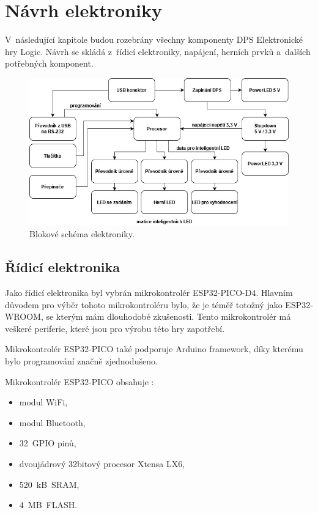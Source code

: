 \chapter{Návrh elektroniky}
V~následující kapitole budou rozebrány všechny komponenty DPS Elektronické hry Logic. Návrh se skládá z~řídicí elektroniky, 
napájení, herních prvků a~dalších potřebných komponent.

\begin{figure}[!h]
  \begin{center}
    \includegraphics[scale=0.6]{obrazky/v2_blokove_schema.jpg}
  \end{center}
  \caption[Blokové schéma elektroniky]{Blokové schéma elektroniky.}
\end{figure}    

\section{Řídicí elektronika} \label{Ridici_elektronika}
Jako řídicí elektronika byl vybrán mikrokontrolér ESP32-PICO-D4. Hlavním důvodem pro výběr tohoto mikrokontroléru bylo, že je téměř totožný 
jako ESP32-WROOM, se 
kterým mám dlouhodobé zkušenosti. Tento mikrokontrolér má veškeré periferie, které jsou pro výrobu této hry zapotřebí. 

Mikrokontrolér ESP32-PICO také podporuje Arduino framework, díky kterému bylo programování značně zjednodušeno.

Mikrokontrolér ESP32-PICO obsahuje \cite{PICO_datasheet}: 
\begin{itemize}
    \item modul WiFi,
    \item modul Bluetooth, 
    \item 32~GPIO pinů, 
    \item dvoujádrový 32bitový procesor Xtensa LX6,
    \item 520~kB~SRAM, 
    \item 4~MB~FLASH. 
  \end{itemize}

